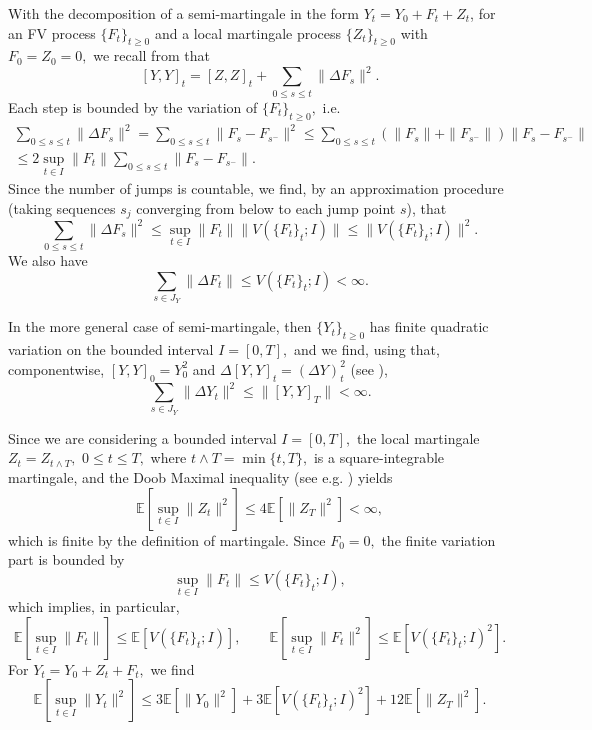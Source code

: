 \documentclass[reqno,12pt]{amsart}
\theoremstyle{plain} %
\theoremstyle{definition} %
\begin{document}
With the decomposition of a semi-martingale in the form $Y_t = Y_0 + F_t + Z_t$, for an FV process $\{F_t\}_{t\geq 0}$ and a local martingale process $\{Z_t\}_{t\geq 0}$ with $F_0 = Z_0 = 0,$ we recall from \cite[Lemma 18.7]{Metivier1982} that
\[
    [Y, Y]_t = [Z, Z]_t + \sum_{0 \leq s \leq t} \|\Delta F_s\|^2.
\]
Each step is bounded by the variation of $\{F_t\}_{t\geq 0},$ i.e.
\begin{multline*}
    \sum_{0 \leq s \leq t} \|\Delta F_s\|^2 = \sum_{0 \leq s \leq t} \|F_s - F_{s^-}\|^2 \leq \sum_{0 \leq s \leq t} (\|F_s\| + \|F_{s^-}\|)\|F_s - F_{s^-}\| \\
    \leq 2\sup_{t\in I} \|F_t\| \sum_{0 \leq s \leq t} \|F_s - F_{s^-}\|.
\end{multline*}
Since the number of jumps is countable, we find, by an approximation procedure (taking sequences $s_j$ converging from below to each jump point $s$), that
\[
    \sum_{0 \leq s \leq t} \|\Delta F_s\|^2 \leq \sup_{t\in I} \|F_t\| \|V(\{F_t\}_t; I)\| \leq \|V(\{F_t\}_t; I)\|^2.
\]
We also have
\begin{equation}
    \label{estimatejumpfv}
    \sum_{s\in J_{Y}} \|\Delta F_t\| \leq V(\{F_t\}_t; I) < \infty.
\end{equation}

In the more general case of semi-martingale, then $\{Y_t\}_{t\geq 0}$ has finite quadratic variation \cite[Section II.6]{Protter2005} on the bounded interval $I=[0, T],$ and we find, using that, componentwise, $[Y, Y]_0 = Y_0^2$ and $\Delta [Y, Y]_t = (\Delta Y)_t^2$ (see \cite[Theorem II.22]{Protter2005}),
\begin{equation}
    \label{estimatejumpsemimartingale}
    \sum_{s\in J_{Y}} \|\Delta Y_t\|^2 \leq \|[Y, Y]_T\| < \infty.
\end{equation}

Since we are considering a bounded interval $I=[0, T],$ the local martingale $Z_t = Z_{t \land T},$ $0\leq t \leq T,$ where $t \land T = \min\{t, T\},$ is a square-integrable martingale, and the Doob Maximal inequality (see e.g. \cite[Theorem I.20]{Protter2005}) yields
\[
    \mathbb{E}\left[\sup_{t\in I} \|Z_t\|^2\right] \leq 4\mathbb{E}[\|Z_T\|^2] < \infty,
\]
which is finite by the definition of martingale. Since $F_0 = 0,$ the finite variation part is bounded by
\[
    \sup_{t\in I} \|F_t\| \leq V(\{F_t\}_t; I),
\]
which implies, in particular,
\[
    \mathbb{E}\left[\sup_{t\in I} \|F_t\|\right] \leq \mathbb{E}\left[V(\{F_t\}_t; I)\right], \qquad \mathbb{E}\left[\sup_{t\in I} \|F_t\|^2\right] \leq \mathbb{E}\left[V(\{F_t\}_t; I)^2\right].
\]
For $Y_t = Y_0 + Z_t + F_t,$ we find
\[
    \mathbb{E}\left[\sup_{t\in I} \|Y_t\|^2\right] \leq 3\mathbb{E}[\|Y_0\|^2] + 3\mathbb{E}\left[V(\{F_t\}_t; I)^2\right] + 12\mathbb{E}[\|Z_T\|^2].
\]
\end{document}
